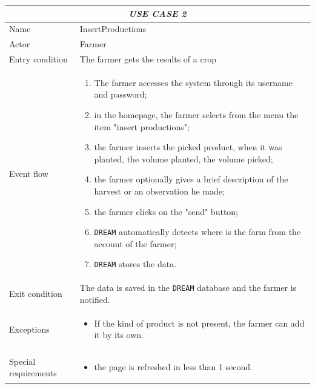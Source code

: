 \documentclass{article}
\begin{document}
\centering
\begin{longtable}{|p{3.5cm}|m{8cm}|}
 \hline
 \multicolumn{2}{|c|}{\cellcolor{white}\emph{USE CASE 2}} \\
 \endfirsthead
 \endhead
 \endfoot
 \endlastfoot
 \hline
 Name & InsertProductions\\
 \hline
 Actor & Farmer\\
 \hline
 Entry condition & The farmer gets the results of a crop\\
 \hline
 Event flow & \begin{enumerate}
    \item The farmer accesses the system through its username and password;
    \item in the homepage, the farmer selects from the menu the item "insert productions";
    \item the farmer inserts the picked product, when it was planted, the volume planted, the volume picked;
    \item the farmer optionally gives a brief description of the harvest or an observation he made;
    \item the farmer clicks on the "send" button;
    \item \verb|DREAM| automatically detects where is the farm from the account of the farmer;
    \item \verb|DREAM| stores the data.
 \end{enumerate}\\
 \hline
 Exit condition & The data is saved in the \verb|DREAM| database and the farmer is notified.\\
 \hline
 Exceptions & \begin{itemize}
     \item If the kind of product is not present, the farmer can add it by its own.
 \end{itemize}\\
 \hline
 Special requirements & \begin{itemize}
     \item the page is refreshed in less than 1 second.
 \end{itemize}\\
 \hline
\end{longtable}
\end{document}
